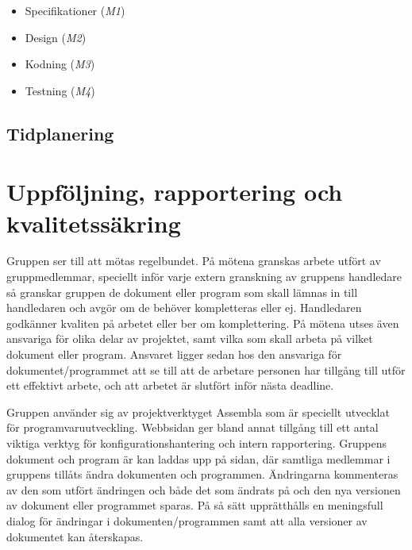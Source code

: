 \documentclass[a4paper]{article}
\begin{document}
\begin{itemize}
  \item Specifikationer (\emph{M1})
  \item Design (\emph{M2})
  \item Kodning (\emph{M3})
  \item Testning (\emph{M4})
\end{itemize}

\begin{center}
\begin{figure}[htbp]
\end{figure}
\end{center}



\subsection{Tidplanering} %

\section{Uppföljning, rapportering och kvalitetssäkring} %
Gruppen ser till att mötas regelbundet. På mötena granskas arbete utfört av gruppmedlemmar, speciellt inför
varje extern granskning av gruppens handledare så granskar gruppen de dokument eller program som 
skall lämnas in till handledaren och avgör om de behöver kompletteras eller ej. Handledaren godkänner kvaliten på
arbetet eller ber om komplettering. På mötena utses även ansvariga för olika delar av projektet, samt vilka som skall 
arbeta på vilket dokument eller program. Ansvaret ligger sedan hos den ansvariga för dokumentet/programmet att se till
att de arbetare personen har tillgång till utför ett effektivt arbete, och att arbetet är slutfört inför nästa deadline.

Gruppen använder sig av projektverktyget Assembla som är speciellt utvecklat för programvaruutveckling. 
Webbsidan ger bland annat tillgång  till ett antal viktiga verktyg för konfigurationshantering och intern rapportering.
Gruppens dokument och program är kan laddas upp på sidan, där samtliga medlemmar i gruppens tillåts ändra dokumenten
och programmen. Ändringarna kommenteras av den som utfört ändringen och både det som ändrats på och den nya 
versionen av dokument eller programmet sparas. På så sätt  upprätthålls en meningsfull dialog för ändringar i dokumenten/programmen
samt att alla versioner av dokumentet kan återskapas. 
\end{document}
